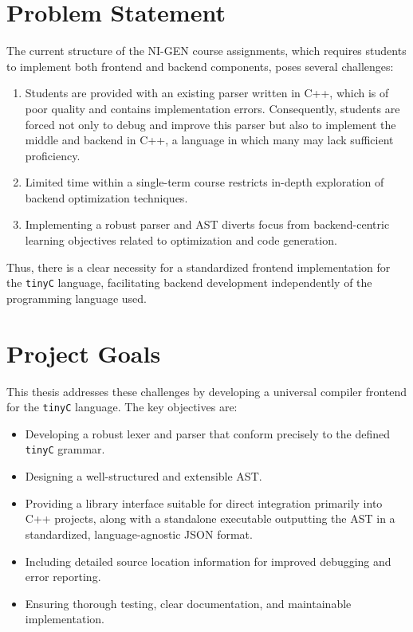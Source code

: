 \section{Problem Statement}

The current structure of the NI-GEN course assignments, which requires students to implement both frontend and backend components, poses several challenges:

\begin{enumerate}
    \item Students are provided with an existing parser written in C++, which is of poor quality and contains implementation errors. Consequently, students are forced not only to debug and improve this parser but also to implement the middle and backend in C++, a language in which many may lack sufficient proficiency.
    \item Limited time within a single-term course restricts in-depth exploration of backend optimization techniques.
    \item Implementing a robust parser and AST diverts focus from backend-centric learning objectives related to optimization and code generation.
\end{enumerate}

Thus, there is a clear necessity for a standardized frontend implementation for the \texttt{tinyC} language, facilitating backend development independently of the programming language used.

\section{Project Goals}

This thesis addresses these challenges by developing a universal compiler frontend for the \texttt{tinyC} language. The key objectives are:

\begin{itemize}
\item Developing a robust lexer and parser that conform precisely to the defined \texttt{tinyC} grammar.
\item Designing a well-structured and extensible AST.
\item Providing a library interface suitable for direct integration primarily into C++ projects, along with a standalone executable outputting the AST in a standardized, language-agnostic JSON format.
\item Including detailed source location information for improved debugging and error reporting.
\item Ensuring thorough testing, clear documentation, and maintainable implementation.
\end{itemize}

